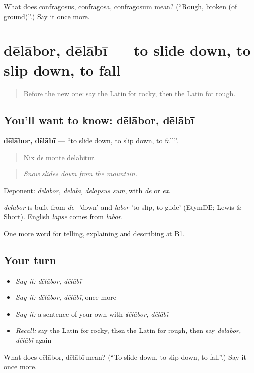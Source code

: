 \begin{tcolorbox}[breakable,colback=teal!4,colframe=teal!35!black,title={Before you move on}]
What does cōnfragōsus, cōnfragōsa, cōnfragōsum mean? (\textquotedblleft{}Rough, broken (of ground)\textquotedblright{}.) Say it once more.
\end{tcolorbox}
\section[dēlābor, dēlābī]{dēlābor, dēlābī — to slide down, to slip down, to fall}

\label{lesson:LA-C481-delabor}



\begin{quote}
Before the new one: say the Latin for rocky, then the Latin for rough.
\end{quote}

\subsection*{You'll want to know: dēlābor, dēlābī}
\textbf{dēlābor, dēlābī} — \textquotedblleft{}to slide down, to slip down, to fall\textquotedblright{}.

\begin{quote}
Nix dē monte dēlābitur.
\end{quote}

\begin{quote}
\emph{Snow slides down from the mountain.}
\end{quote}

Deponent: \emph{dēlābor, dēlābī, dēlāpsus sum}, with \emph{dē} or \emph{ex}.

\begin{cousinweb}
\emph{dēlābor} is built from \emph{dē-} 'down' and \emph{lābor} 'to slip, to glide' (EtymDB; Lewis \& Short). English \emph{lapse} comes from \emph{lābor}.
\end{cousinweb}

\begin{grammarlens}[title={What you've built}]
One more word for telling, explaining and describing at B1.
\end{grammarlens}

\subsection*{Your turn}
\begin{itemize}
\raggedright
  \item \emph{Say it:} \emph{dēlābor, dēlābī}
  \item \emph{Say it:} \emph{dēlābor, dēlābī}, once more
  \item \emph{Say it:} a sentence of your own with \emph{dēlābor, dēlābī}
  \item \emph{Recall:} say the Latin for rocky, then the Latin for rough, then say \emph{dēlābor, dēlābī} again
\end{itemize}

\begin{tcolorbox}[breakable,colback=teal!4,colframe=teal!35!black,title={Before you move on}]
What does dēlābor, dēlābī mean? (\textquotedblleft{}To slide down, to slip down, to fall\textquotedblright{}.) Say it once more.
\end{tcolorbox}
